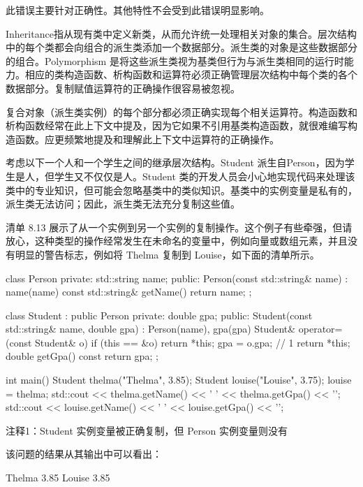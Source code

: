 此错误主要针对正确性。其他特性不会受到此错误明显影响。

Inheritance指从现有类中定义新类，从而允许统一处理相关对象的集合。层次结构中的每个类都会向组合的派生类添加一个数据部分。派生类的对象是这些数据部分的组合。Polymorphism 是将这些派生类视为基类但行为与派生类相同的运行时能力。相应的类构造函数、析构函数和运算符必须正确管理层次结构中每个类的各个数据部分。复制赋值运算符的正确操作很容易被忽视。


复合对象（派生类实例）的每个部分都必须正确实现每个相关运算符。构造函数和析构函数经常在此上下文中提及，因为它如果不引用基类构造函数，就很难编写构造函数。应更频繁地提及和理解此上下文中运算符的正确操作。

考虑以下一个人和一个学生之间的继承层次结构。Student 派生自Person，因为学生是人，但学生又不仅仅是人。Student 类的开发人员会小心地实现代码来处理该类中的专业知识，但可能会忽略基类中的类似知识。基类中的实例变量是私有的，派生类无法访问；因此，派生类无法充分复制这些值。

清单 8.13 展示了从一个实例到另一个实例的复制操作。这个例子有些牵强，但请放心，这种类型的操作经常发生在未命名的变量中，例如向量或数组元素，并且没有明显的警告标志，例如将 Thelma 复制到 Louise，如下面的清单所示。


\begin{cpp}
class Person {
private:
  std::string name;
public:
  Person(const std::string& name) : name(name) {}
  const std::string& getName() { return name; }
};

class Student : public Person {
private:
  double gpa;
public:
  Student(const std::string& name, double gpa) : Person(name), gpa(gpa) {}
  Student& operator=(const Student& o) {
    if (this == &o)
      return *this;
    gpa = o.gpa; // 1
    return *this;
  }
double getGpa() const { return gpa; }
};

int main() {
  Student thelma("Thelma", 3.85);
  Student louise("Louise", 3.75);
  louise = thelma;
  std::cout << thelma.getName() << ' ' << thelma.getGpa() << '\n';
  std::cout << louise.getName() << ' ' << louise.getGpa() << '\n';
}
\end{cpp}

{\footnotesize
注释1：Student 实例变量被正确复制，但 Person 实例变量则没有
}

该问题的结果从其输出中可以看出：

\begin{shell}
Thelma 3.85
Louise 3.85
\end{shell}

